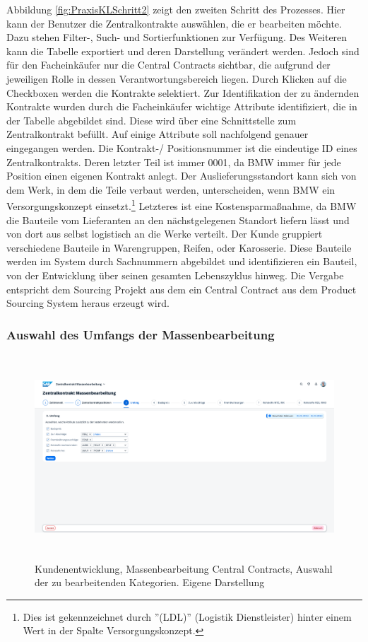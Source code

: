 Abbildung \ref{fig:PraxisKLSchritt2} zeigt den zweiten Schritt des Prozesses. Hier kann der Benutzer die Zentralkontrakte auswählen, die er bearbeiten möchte. Dazu stehen Filter-, Such- und Sortierfunktionen zur Verfügung. Des Weiteren kann die Tabelle exportiert und deren Darstellung verändert werden. Jedoch sind für den Facheinkäufer nur die Central Contracts sichtbar, die aufgrund der jeweiligen Rolle in dessen Verantwortungsbereich liegen. Durch Klicken auf die Checkboxen werden die Kontrakte selektiert. Zur Identifikation der zu ändernden Kontrakte wurden durch die Facheinkäufer wichtige Attribute identifiziert, die in der Tabelle abgebildet sind. Diese wird über eine Schnittstelle zum Zentralkontrakt befüllt. Auf einige Attribute soll nachfolgend genauer eingegangen werden. Die Kontrakt-/ Positionsnummer ist die eindeutige ID eines Zentralkontrakts. Deren letzter Teil ist immer 0001, da BMW immer für jede Position einen eigenen Kontrakt anlegt. Der Auslieferungsstandort kann sich von dem Werk, in dem die Teile verbaut werden, unterscheiden, wenn BMW ein Versorgungskonzept einsetzt.\footnote{Dies ist gekennzeichnet durch ''(LDL)'' (Logistik Dienstleister) hinter einem Wert in der Spalte Versorgungskonzept.} Letzteres ist eine Kostensparmaßnahme, da BMW die Bauteile vom Lieferanten an den nächstgelegenen Standort liefern lässt und von dort aus selbst logistisch an die Werke verteilt. Der Kunde gruppiert verschiedene Bauteile in Warengruppen, \zB Reifen, oder Karosserie. Diese Bauteile werden im System durch Sachnummern abgebildet und identifizieren ein Bauteil, von der Entwicklung über seinen gesamten Lebenszyklus hinweg. Die Vergabe entspricht dem Sourcing Projekt aus dem ein Central Contract aus dem Product Sourcing System heraus erzeugt wird. 

\subsubsection{Auswahl des Umfangs der Massenbearbeitung}

\begin{figure}[H]
    \centering
    \includegraphics[height=7.65cm]{Bilder/Praxisteil-KL-Schritt-3.png}
    \caption[Kundenentwicklung, Massenbearbeitung Central Contracts, Auswahl der zu bearbeitenden Kategorien]{Kundenentwicklung, Massenbearbeitung Central Contracts, Auswahl der zu bearbeitenden Kategorien. Eigene Darstellung}
    \label{fig:PraxisKLSchritt3}
\end{figure}

